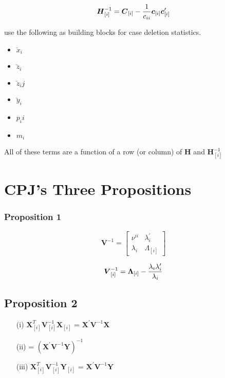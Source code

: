 \documentclass[Chap5amain.tex]{subfiles}
\begin{document}
\[ \boldsymbol{H}_{[i]}^{-1}  = \boldsymbol{C}_{[i]} - {1 \over c_{ii}}\boldsymbol{c}_{[i]}\boldsymbol{c}_{[i]}^{\prime} \]


\citet{CPJ} use the following as building blocks for case deletion statistics.
\begin{itemize}
\item $\breve{x}_i$
\item $\breve{z}_i$
\item $\breve{z}_ij$
\item $\breve{y}_i$
\item $p_ii$
\item $m_i$
\end{itemize}
All of these terms are a function of a row (or column) of $\boldsymbol{H}$ and $\boldsymbol{H}_{[i]}^{-1}$

\newpage
\section{CPJ's Three Propositions} %


\subsubsection{Proposition 1}

\[
\boldsymbol{V}^{-1} =
\left[ \begin{array}{cc}
\nu^{ii} & \lambda_{i}^{\prime}  \\
\lambda_{i} & \Lambda_{[i]}
\end{array}\right] \]


\[\boldsymbol{V}_{[i]}^{-1} = \boldsymbol{\Lambda}_{[i]} - { \lambda_{i} \lambda_{i} ^{\prime} \over \lambda_{i} } \]

\subsection{Proposition 2}

\begin{itemize}
\item[(i)] $ \boldsymbol{X}_{[i]}^{T}\boldsymbol{V}^{-1}_{[i]}\boldsymbol{X}_{[i]}$ = $\boldsymbol{X}^{\prime}\boldsymbol{V}^{-1}\boldsymbol{X}$
\item[(ii)] = $(\boldsymbol{X}^{\prime}\boldsymbol{V}^{-1}\boldsymbol{Y})^{-1}$
\item[(iii)] $ \boldsymbol{X}_{[i]}^{T}\boldsymbol{V}^{-1}_{[i]}\boldsymbol{Y}_{[i]}$ = $\boldsymbol{X}^{\prime}\boldsymbol{V}^{-1}\boldsymbol{Y}$
\end{itemize}
\end{document}
